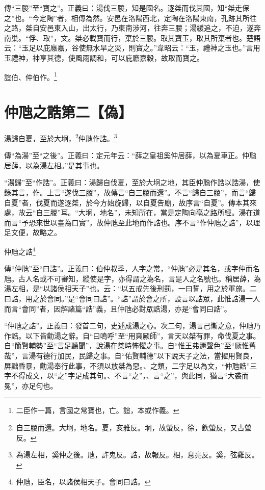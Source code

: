 {\noindent\shu{}\fzkt 傳“三朡”至“寶之”。正義曰：湯伐三朡，知是國名。逐桀而伐其國，知“桀走保之”也。“今定陶”者，相傳為然。安邑在洛陽西北，定陶在洛陽東南，孔跡其所往之路，桀自安邑東入山，出太行，乃東南涉河，往奔三朡；湯緩追之，不迫，遂奔南巢。“俘、取”，文。桀必載寶而行，棄於三朡。取其寶玉，取其所棄者也。楚語云：“玉足以庇廕嘉，谷使無水旱之災，則寶之。”韋昭云：“玉，禮神之玉也。”言用玉禮神，神享其德，使風雨調和，可以庇廕嘉穀，故取而寶之。 \par}

誼伯、仲伯作。\footnote{二臣作一篇，言國之常寶也，亡。誼，本或作義。}

\section{仲虺之誥第二【偽】}

湯歸自夏，至於大坰，\footnote{自三朡而還。大坰，地名。夏，亥雅反。坰，故螢反，徐，欽螢反，又古螢反。}仲虺作誥。\footnote{為湯左相，奚仲之後。虺，許鬼反。誥，故報反。相，息亮反。奚，弦雞反。}


{\noindent\zhuan{}\fzbyks 傳“為湯”至“之後”。正義曰：定元年云：“薛之皇祖奚仲居薛，以為夏車正。仲虺居薛，以為湯左相。”是其事也。 \par}

{\noindent\shu{}\fzkt “湯歸”至“作誥”。正義曰：湯歸自伐夏，至於大坰之地，其臣仲虺作誥以誥湯，使錄其言，作。上言“遂伐三朡”，故傳言“自三朡而還”。不言“歸自三朡”，而言“歸自夏”者，伐夏而遂逐桀，於今方始旋歸，以自夏告廟，故序言“自夏”。傳本其來處，故云“自三朡”耳。“大坰，地名”，未知所在，當是定陶向亳之路所經。湯在道而言“予恐來世以臺為口實”，故仲虺至此地而作誥也。序不言“作仲虺之誥”，以理足文便，故略之。 \par}

仲虺之誥\footnote{仲虺，臣名，以諸侯相天子。會同曰誥。}


{\noindent\zhuan{}\fzbyks 傳“仲虺”至“曰誥”。正義曰：伯仲叔季，人字之常，“仲虺”必是其名，或字仲而名虺。古人名或不可審知，縱使是字，亦得謂之為名，言是人之名號也。稱居薛，為湯左相，是“以諸侯相天子”也。云：“以五戒先後刑罰，一曰誓，用之於軍旅。二曰誥，用之於會同。”是“會同曰誥”。“誥”謂於會之所，設言以誥眾，此惟誥湯一人而言“會同”者，因解諸篇“誥”義，且仲虺必對眾誥湯，亦是“會同曰誥”。 \par}

{\noindent\shu{}\fzkt “仲虺之誥”。正義曰：發首二句，史述成湯之心。次二句，湯言己慚之意，仲虺乃作誥。以下皆勸湯之辭。自“曰嗚呼”至“用爽厥師”，言天以桀有罪，命伐夏之事。自“簡賢輔勢”至“言足聽聞”，說湯在桀時怖懼之事。自“惟王弗邇聲色”至“厥惟舊哉”，言湯有德行加民，民歸之事。自“佑賢輔德”以下說天子之法，當擢用賢良，屏黜昏暴，勸湯奉行此事，不須以放桀為惡。、之類，二字足以為文，“仲虺誥”三字不得成文，以“之”字足成其句。、不言“之”，、言“之”，與此同，猶言“大裘而冕”，亦足句也。 \par}

